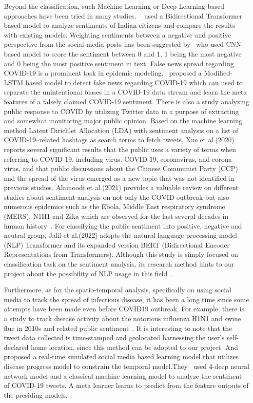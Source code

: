 Beyond the classification, such Machine Learning or Deep Learning-based
approaches have been tried in many studies. ~\cite{chintalapudi2021sentimental} used a Bidirectional
Transformer based model to analyze sentiments of Indian citizens and compare
the results with existing models. Weighting sentiments between a negative and
positive perspective from the social media posts has been suggested by~\cite{alshalan2020detection} who used CNN-based model to score the sentiment between 0 and 1, 1 being
the most negative and 0 being the most positive sentiment in text. False news
spread regarding COVID-19 is a prominent task in epidemic modeling.~\cite{abdelminaam2021coaid} proposed a Modified-LSTM based model to detect fake news regarding
COVID-19 which can used to separate the unintentional biases in a COVID-19
data stream and learn the meta features of a falsely claimed COVID-19
sentiment. There is also a study analyzing public response to COVID by
utilizing Twitter data in a purpose of extracting and somewhat monitoring
major public opinion. Based on the machine learning method Latent Dirichlet
Allocation (LDA) with sentiment analysis on a list of COVID-19–related
hashtags as search terms to fetch tweets, Xue et al.(2020) reports several
significant results that the public uses a variety of terms when referring to
COVID-19, including virus, COVID-19, coronavirus, and corona virus, and that
public discussions about the Chinese Communist Party (CCP) and the spread of
the virus emerged as a new topic that was not identified in previous studies. Alamoodi et al.(2021) provides a valuable review on different
studies about sentiment analysis on not only the COVID outbreak but also
numerous epidemics such as the Ebola, Middle East respiratory syndrome
(MERS), N1H1 and Zika which are observed for the last several decades in
human history~\cite{alamoodi2021sentiment}. For classifying the public sentiment into positive,
negative and neutral group, Jalil et al.(2022) adopts the natural language
processing model (NLP) Transformer and its expanded version BERT
(Bidirectional Encoder Representations from Transformers). Although this
study is simply focused on classification task on the sentiment analysis, its
research method hints to our project about the possibility of NLP usage in
this field~\cite{jalil2021covid}.

Furthermore, as for the spatio-temporal analysis, specifically on using social
media to track the spread of infectious disease, it has been a long time
since some attempts have been made even before COVID19 outbreak. For example,
there is a study to track disease activity about the notorious influenza H1N1
and swine flue in 2010s and related public sentiment~\cite{signorini2011use}. It is interesting
to note that the tweet data collected is time-stamped and geolocated
harnessing the user’s self-declared home location, since this method can be
adopted to our project. And~\cite{signorini2011use} proposed a real-time simulated social media
based learning model that utilizes disease progress model to constrain the
temporal model.They~\cite{basiri2021novel} used 4-deep neural network model and a classical machine
learning model to analyze the sentiment of COVID-19 tweets. A meta learner
learns to predict from the feature outputs of the presiding models.

